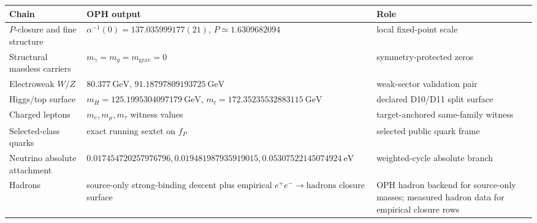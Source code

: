 \documentclass[11pt]{article}
\begin{document}
\begin{table}[h]
\centering
\scriptsize
\setlength{\tabcolsep}{3pt}
\begin{tabular}{@{}>{\raggedright\arraybackslash}p{}>{\raggedright\arraybackslash}p{}>{\raggedright\arraybackslash}p{}@{}}
\toprule
Chain & OPH output & Role \\
\midrule
\(P\)-closure and fine structure & \(\alpha^{-1}(0)=137.035999177(21)\), \(P\simeq1.6309682094\) & local fixed-point scale \\
Structural massless carriers & \(m_\gamma=m_g=m_{\mathrm{grav}}=0\) & symmetry-protected zeros \\
Electroweak \(W/Z\) & \(80.377~\mathrm{GeV}\), \(91.18797809193725~\mathrm{GeV}\) & weak-sector validation pair \\
Higgs/top surface & \(m_H=125.1995304097179~\mathrm{GeV}\), \(m_t=172.35235532883115~\mathrm{GeV}\) & declared D10/D11 split surface \\
Charged leptons & \(m_e,m_\mu,m_\tau\) witness values & target-anchored same-family witness \\
Selected-class quarks & exact running sextet on \(f_P\) & selected public quark frame \\
Neutrino absolute attachment & \(0.017454720257976796,0.019481987935919015,0.05307522145074924~\mathrm{eV}\) & weighted-cycle absolute branch \\
Hadrons & source-only strong-binding descent plus empirical \(e^+e^-\to\mathrm{hadrons}\) closure surface & OPH hadron backend for source-only masses; measured hadron data for empirical closure rows \\
\bottomrule
\end{tabular}
\end{table}
\end{document}

